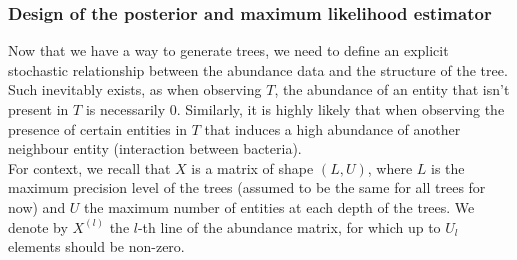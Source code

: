 \subsubsection{Design of the posterior and maximum likelihood estimator}

\newcommand{\childrennode}{\mathcal{C}}


Now that we have a way to generate trees, we need to define an explicit stochastic relationship between the abundance
data and the structure of the tree.
Such inevitably exists, as when observing $T$, the abundance of an entity that isn't present in $T$ is necessarily 0.
Similarly, it is highly likely that when observing the presence of certain entities in $T$ that induces a high abundance of
another neighbour entity (interaction between bacteria). \\

For context, we recall that $X$ is a matrix of shape $(L, U)$,
where $L$ is the maximum precision level of the trees (assumed to be the same for all trees for now) and $U$ the maximum number of entities at each depth of the trees.
We denote by $X^{(l)}$ the $l$-th line of the abundance matrix, for which up to $U_l$ elements should be non-zero. \\


